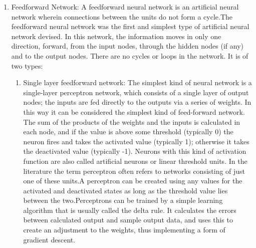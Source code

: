 \documentclass[a4paper, 12pt]{article}
\begin{document}
\begin{enumerate}
\item Feedforward Network: A feedforward neural network is an artificial neural network wherein connections between the units do not form a cycle.The feedforward neural network was the first and simplest type of artificial neural network devised. In this network, the information moves in only one direction, forward, from the input nodes, through the hidden nodes (if any) and to the output nodes. There are no cycles or loops in the network. It is of two types: 
\begin{enumerate}
\item Single layer feedforward network: The simplest kind of neural network is a single-layer perceptron network, which consists of a single layer of output nodes; the inputs are fed directly to the outputs via a series of weights. In this way it can be considered the simplest kind of feed-forward network. The sum of the products of the weights and the inputs is calculated in each node, and if the value is above some threshold (typically 0) the neuron fires and takes the activated value (typically 1); otherwise it takes the deactivated value (typically -1). Neurons with this kind of activation function are also called artificial neurons or linear threshold units. In the literature the term perceptron often refers to networks consisting of just one of these units.A perceptron can be created using any values for the activated and deactivated states as long as the threshold value lies between the two.Perceptrons can be trained by a simple learning algorithm that is usually called the delta rule. It calculates the errors between calculated output and sample output data, and uses this to create an adjustment to the weights, thus implementing a form of gradient descent.

\end{enumerate}
\end{enumerate}
\end{document}
